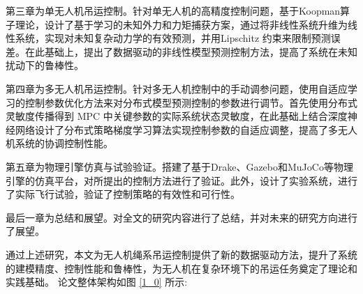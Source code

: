 \documentclass[lang=chs, degree=master, blindreview=true, winfonts=true]{yanputhesis}
\begin{document}
第三章为单无人机吊运控制。针对单无人机的高精度控制问题，基于Koopman算子理论，设计了基于学习的未知外力和力矩捕获方案，通过将非线性系统升维为线性系统，实现对未知复杂动力学的有效预测，并用Lipschitz 约束来限制预测误差。在此基础上，提出了数据驱动的非线性模型预测控制方法，提高了系统在未知扰动下的鲁棒性。

第四章为多无人机吊运控制。针对多无人机控制中的手动调参问题，使用自适应学习的控制参数优化方法来对分布式模型预测控制的参数进行调节。首先使用分布式灵敏度传播得到 MPC 中关键参数的实际系统状态灵敏度，在此基础上结合深度神经网络设计了分布式策略梯度学习算法实现控制参数的自适应调整，提高了多无人机系统的协调控制性能。

第五章为物理引擎仿真与试验验证。搭建了基于Drake、Gazebo和MuJoCo等物理引擎的仿真平台，对所提出的控制方法进行了验证。此外，设计了实验系统，进行了实际飞行试验，验证了控制策略的有效性和可行性。

最后一章为总结和展望。对全文的研究内容进行了总结，并对未来的研究方向进行了展望。

通过上述研究，本文为无人机绳系吊运控制提供了新的数据驱动方法，提升了系统的建模精度、控制性能和鲁棒性，为无人机在复杂环境下的吊运任务奠定了理论和实践基础。
论文整体架构如图 \ref{1_0} 所示:
\end{document}
